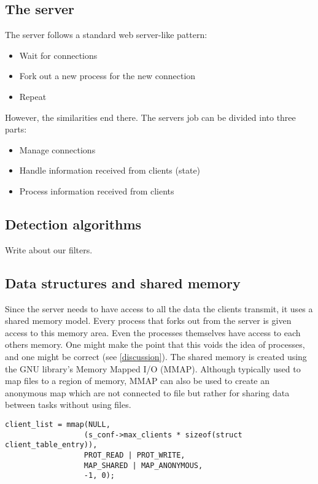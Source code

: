 \documentclass[12pt,english,a4paper]{report}
\begin{document}
\subsection{The server}
The server follows a standard web server-like pattern:
\begin{itemize}
  \item Wait for connections
  \item Fork out a new process for the new connection
  \item Repeat
\end{itemize}
However, the similarities end there. The servers job can be divided into three parts:
\begin{itemize}
  \item Manage connections
  \item Handle information received from clients (state)
  \item Process information received from clients
\end{itemize}

\subsection{Detection algorithms}
Write about our filters.

\subsection{Data structures and shared memory}
Since the server needs to have access to all the data the clients transmit, it uses a shared memory model. Every process that forks out from the server is given access to this memory area. Even the processes themselves have access to each others memory. One might make the point that this voids the idea of processes, and one might be correct (see \ref{discussion}). The shared memory is created using the GNU library's Memory Mapped I/O (MMAP). Although typically used to map files to a region of memory, MMAP can also be used to create an anonymous map which are not connected to file but rather for sharing data between tasks without using files.

\begin{lstlisting}
client_list = mmap(NULL, 
                  (s_conf->max_clients * sizeof(struct client_table_entry)), 
                  PROT_READ | PROT_WRITE,
                  MAP_SHARED | MAP_ANONYMOUS,
                  -1, 0);
\end{lstlisting}
\end{document}
